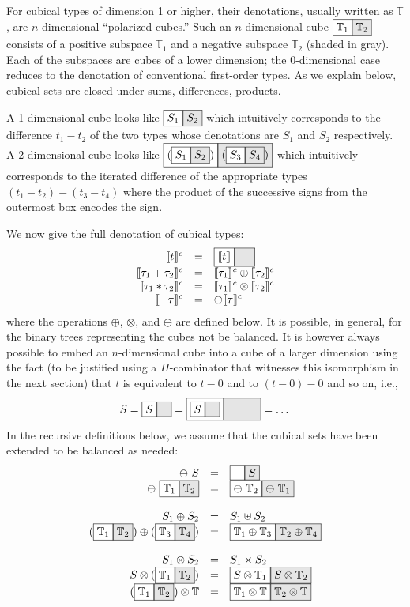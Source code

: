 \documentclass[authoryear,preprint]{sigplanconf}
\newcommand{\cubt}{\mathbb{T}}
\newcommand{\den}[1]{\llbracket #1 \rrbracket}
\newcommand{\denc}[1]{\llbracket #1 \rrbracket^c}
\newcommand{\nodet}[2]{\fcolorbox{black}{white}{$#1$}\fcolorbox{black}{gray!20}{$#2$}}
\begin{document}
For cubical types of dimension 1 or higher, their denotations, usually
written as $\cubt$, are $n$-dimensional ``polarized cubes.'' Such an
$n$-dimensional cube $\nodet{\cubt_1}{\cubt_2}$ consists of a positive
subspace $\cubt_1$ and a negative subspace $\cubt_2$ (shaded in gray). Each
of the subspaces are cubes of a lower dimension; the $0$-dimensional case
reduces to the denotation of conventional first-order types. As we explain
below, cubical sets are closed under sums, differences, products.

A 1-dimensional cube looks like $\nodet{S_1}{S_2}$ which intuitively
corresponds to the difference $t_1 - t_2$ of the two types whose denotations
are $S_1$ and $S_2$ respectively. A 2-dimensional cube looks like
$\nodet{(\nodet{S_1}{S_2})}{(\nodet{S_3}{S_4})}$ which intuitively
corresponds to the iterated difference of the appropriate types
$(t_1-t_2)-(t_3-t_4)$ where the product of the successive signs from the
outermost box encodes the sign.

We now give the full denotation of cubical types:
\[\begin{array}{rcl}
\denc{t} &=& \nodet{\den{t}}{\phantom{\den{t}}} \\
\denc{\tau_1 + \tau_2} &=& \denc{\tau_1} \oplus \denc{\tau_2} \\
\denc{\tau_1 * \tau_2} &=& \denc{\tau_1} \otimes \denc{\tau_2} \\
\denc{- \tau} &=& \ominus \denc{\tau}
\end{array}\]
where the operations $\oplus$, $\otimes$, and $\ominus$ are defined below.
It is possible, in general, for the binary trees representing the cubes not
be balanced. It is however always possible to embed an $n$-dimensional cube
into a cube of a larger dimension using the fact (to be justified using a
$\Pi$-combinator that witnesses this isomorphism in the next section) that
$t$ is equivalent to $t-0$ and to $(t-0)-0$ and so on, i.e.,
\[
S = \nodet{S}{\phantom{S}} = 
  \nodet{\nodet{S}{\phantom{S}}}
        {\phantom{{\nodet{S}{\phantom{S}}}}} = \ldots \\
\]
In the recursive definitions below, we assume that the cubical sets have been
extended to be balanced as needed:
\[\begin{array}{rcl}
\ominus~S &=& \nodet{\phantom{S}}{S} \\
\ominus~\nodet{\cubt_1}{\cubt_2} &=& \nodet{\ominus~\cubt_2}{\ominus~\cubt_1} \\
\\
S_1 \oplus S_2 &=& S_1 \uplus S_2 \\
(\nodet{\cubt_1}{\cubt_2}) \oplus (\nodet{\cubt_3}{\cubt_4}) &=& 
  \nodet{\cubt_1 \oplus \cubt_3}{\cubt_2 \oplus \cubt_4} \\
\\
S_1 \otimes S_2 &=& S_1 \times S_2 \\
S \otimes (\nodet{\cubt_1}{\cubt_2}) &=& 
  \nodet{S \otimes \cubt_1}{S \otimes \cubt_2} \\
(\nodet{\cubt_1}{\cubt_2}) \otimes \cubt &=& 
  \nodet{\cubt_1 \otimes \cubt}{\cubt_2 \otimes \cubt}
\end{array}\]
\end{document}
